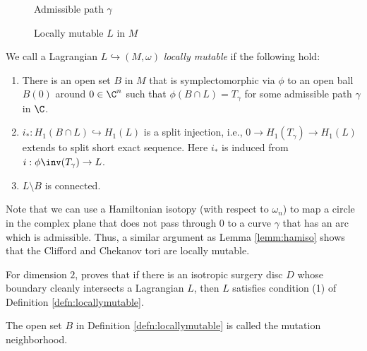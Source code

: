 \begin{figure}[ht]
    \centering
    \caption{Admissible path $\gamma$}
    \label{fig:gamma}
\end{figure}

\begin{figure}[ht]
    \centering
    \caption{Locally mutable $L$ in $M$}
    \label{fig:locpic}
\end{figure}


\begin{defn}\label{defn:locallymutable}
We call a Lagrangian $L \hookrightarrow (M, \omega)$ \textit{locally mutable} if the following hold:
 
 \begin{enumerate}
     \item  There  is an open set $B$ in $M$ that is symplectomorphic via $\phi$ to an open ball $B(0)$ around $0 \in \C^n$ such that   $ \phi ( B \cap L) = T_\gamma$ for some admissible path $\gamma$ in $\C$.
     \item $i_*:H_1( B \cap L) \hookrightarrow H_1(L)$ is a split injection, i.e., $0 \rightarrow H_1 (T_\gamma) \to H_1(L)$ extends to split short exact sequence. Here $i_*$ is induced from $i:\phi\inv(T_\gamma) \to L$. 
      \item $L \setminus B$ is connected.
 \end{enumerate}
\end{defn}



\begin{example}
Note that we can use a Hamiltonian isotopy (with respect to $\omega_n$) to map a circle in the complex plane that does not pass through 0 to a curve $\gamma$ that has an arc which is admissible.  Thus, a similar argument as Lemma \ref{lemm:hamiso} shows that the Clifford and Chekanov tori are locally mutable. 

\end{example}


\begin{remark}
For dimension $2$, \cite{haug} proves that if there is an isotropic surgery disc $D$ whose boundary cleanly intersects a Lagrangian $L$, then $L$ satisfies condition (1) of Definition \ref{defn:locallymutable}. 
\end{remark}

\begin{defn}\label{defn:mutnbd}
The open set $B$ in Definition \ref{defn:locallymutable} is called the mutation neighborhood. 
\end{defn}




